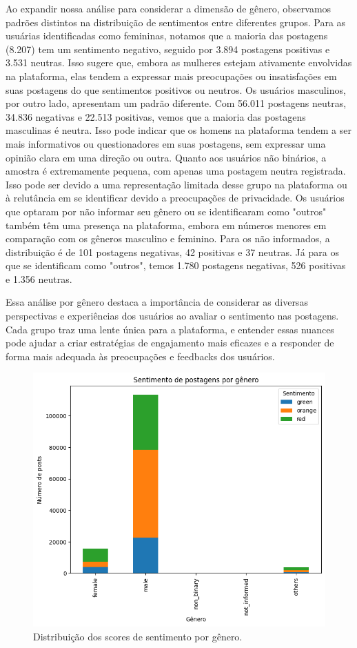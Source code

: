 Ao expandir nossa análise para considerar a dimensão de gênero, observamos padrões distintos na distribuição de sentimentos entre diferentes grupos. Para as usuárias identificadas como femininas, notamos que a maioria das postagens (8.207) tem um sentimento negativo, seguido por 3.894 postagens positivas e 3.531 neutras. Isso sugere que, embora as mulheres estejam ativamente envolvidas na plataforma, elas tendem a expressar mais preocupações ou insatisfações em suas postagens do que sentimentos positivos ou neutros. Os usuários masculinos, por outro lado, apresentam um padrão diferente. Com 56.011 postagens neutras, 34.836 negativas e 22.513 positivas, vemos que a maioria das postagens masculinas é neutra. Isso pode indicar que os homens na plataforma tendem a ser mais informativos ou questionadores em suas postagens, sem expressar uma opinião clara em uma direção ou outra. Quanto aos usuários não binários, a amostra é extremamente pequena, com apenas uma postagem neutra registrada. Isso pode ser devido a uma representação limitada desse grupo na plataforma ou à relutância em se identificar devido a preocupações de privacidade. Os usuários que optaram por não informar seu gênero ou se identificaram como "outros" também têm uma presença na plataforma, embora em números menores em comparação com os gêneros masculino e feminino. Para os não informados, a distribuição é de 101 postagens negativas, 42 positivas e 37 neutras. Já para os que se identificam como "outros", temos 1.780 postagens negativas, 526 positivas e 1.356 neutras.

Essa análise por gênero destaca a importância de considerar as diversas perspectivas e experiências dos usuários ao avaliar o sentimento nas postagens. Cada grupo traz uma lente única para a plataforma, e entender essas nuances pode ajudar a criar estratégias de engajamento mais eficazes e a responder de forma mais adequada às preocupações e feedbacks dos usuários.

\begin{figure}[!htb]
	\caption{Distribuição dos scores de sentimento por gênero.}
	\label{fig:sentiment_by_gender}
	\centering
	\includegraphics[scale=0.8]{images/sentiment_by_gender.png}
	\fautor
\end{figure}

